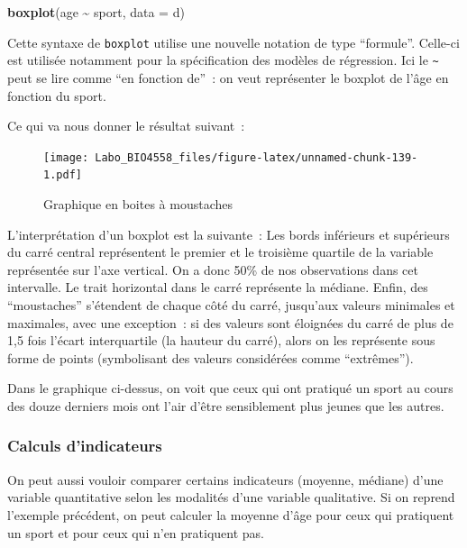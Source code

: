 \documentclass[
  12pt,
]{book}
\makeatletter
\newenvironment{Shaded}{\begin{snugshade}}{\end{snugshade}}
\newcommand{\DataTypeTok}[1]{\textcolor[rgb]{0.13,0.29,0.53}{#1}}
\newcommand{\KeywordTok}[1]{\textcolor[rgb]{0.13,0.29,0.53}{\textbf{#1}}}
\newcommand{\NormalTok}[1]{#1}
\newcommand{\OperatorTok}[1]{\textcolor[rgb]{0.81,0.36,0.00}{\textbf{#1}}}
\newcommand{\StringTok}[1]{\textcolor[rgb]{0.31,0.60,0.02}{#1}}
\newenvironment{kframe}{%
\medskip{}
\setlength{\fboxsep}{.8em}
\def\at@end@of@kframe{}%
\ifinner\ifhmode%
 \def\at@end@of@kframe{\end{minipage}}%
 \begin{minipage}{\columnwidth}%
\fi\fi%
\def\FrameCommand##1{\hskip\@totalleftmargin \hskip-\fboxsep
\colorbox{incolor}{##1}\hskip-\fboxsep
    \hskip-\linewidth \hskip-\@totalleftmargin \hskip\columnwidth}%
\MakeFramed {\advance\hsize-\width
  \@totalleftmargin\z@ \linewidth\hsize
  \@setminipage}}%
{\par\unskip\endMakeFramed%
\at@end@of@kframe}
\newenvironment{rmdblock}[1]
 {
 \begin{itemize}
 \renewcommand{\labelitemi}{
   \raisebox{-.7\height}[0pt][0pt]{
     {\setkeys{Gin}{width=3em,keepaspectratio}\texttt{[image: images/\#1]}}
   }
 }
 \begin{kframe}
 \setlength{\fboxsep}{1em}
 \item
 }
 {
 \end{kframe}
 \end{itemize}
 }
\newenvironment{rmdnote}
  {\begin{rmdblock}{note}}
  {\end{rmdblock}}
\makeatother
\begin{document}
\begin{Shaded}
\begin{Highlighting}[]
\KeywordTok{boxplot}\NormalTok{(age }\OperatorTok{\textasciitilde{}}\StringTok{ }\NormalTok{sport, }\DataTypeTok{data =}\NormalTok{ d)}
\end{Highlighting}
\end{Shaded}

\begin{rmdnote}
Cette syntaxe de \texttt{boxplot} utilise une nouvelle notation de type
``formule''. Celle-ci est utilisée notamment pour la spécification des
modèles de régression. Ici le \texttt{\textasciitilde{}} peut se lire
comme ``en fonction de''~: on veut représenter le boxplot de l'âge en
fonction du sport.
\end{rmdnote}

Ce qui va nous donner le résultat suivant~:

\begin{figure}
\centering
\texttt{[image: Labo\_BIO4558\_files/figure-latex/unnamed-chunk-139-1.pdf]}
\caption{\label{fig:unnamed-chunk-139}Graphique en boites à moustaches}
\end{figure}

\begin{rmdnote}
L'interprétation d'un boxplot est la suivante~: Les bords inférieurs et
supérieurs du carré central représentent le premier et le troisième
quartile de la variable représentée sur l'axe vertical. On a donc 50\%
de nos observations dans cet intervalle. Le trait horizontal dans le
carré représente la médiane. Enfin, des ``moustaches'' s'étendent de
chaque côté du carré, jusqu'aux valeurs minimales et maximales, avec une
exception~: si des valeurs sont éloignées du carré de plus de 1,5 fois
l'écart interquartile (la hauteur du carré), alors on les représente
sous forme de points (symbolisant des valeurs considérées comme
``extrêmes'').
\end{rmdnote}

Dans le graphique ci-dessus, on voit que ceux qui ont pratiqué un sport au cours des douze derniers mois ont l'air d'être sensiblement plus jeunes que les autres.

\hypertarget{calculs-dindicateurs}{%
\subsubsection{Calculs d'indicateurs}\label{calculs-dindicateurs}}

On peut aussi vouloir comparer certains indicateurs (moyenne, médiane) d'une variable quantitative selon les modalités d'une variable qualitative. Si on reprend l'exemple précédent, on peut calculer la moyenne d'âge pour ceux qui pratiquent un sport et pour ceux qui n'en pratiquent pas.
\end{document}
